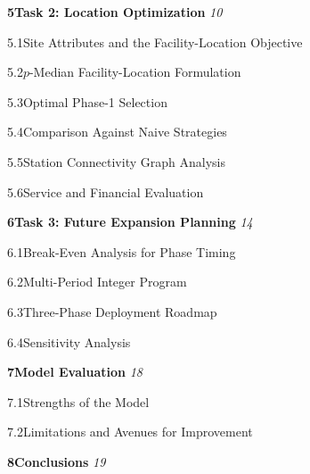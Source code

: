\documentclass[11pt]{article}
\begin{document}
\vspace{0.2em}
\noindent\textbf{5\quad Task 2: Location Optimization} \dotfill \textit{10}
\vspace{-0.4em}
\begin{list}{}{\setlength{\leftmargin}{2.5em}\setlength{\itemsep}{0pt}\setlength{\topsep}{0pt}\setlength{\parsep}{0pt}}
\item 5.1\quad Site Attributes and the Facility-Location Objective 
\item 5.2\quad $p$-Median Facility-Location Formulation 
\item 5.3\quad Optimal Phase-1 Selection 
\item 5.4\quad Comparison Against Naive Strategies 
\item 5.5\quad Station Connectivity Graph Analysis 
\item 5.6\quad Service and Financial Evaluation 
\end{list}

\vspace{0.2em}
\noindent\textbf{6\quad Task 3: Future Expansion Planning} \dotfill \textit{14}
\vspace{-0.4em}
\begin{list}{}{\setlength{\leftmargin}{2.5em}\setlength{\itemsep}{0pt}\setlength{\topsep}{0pt}\setlength{\parsep}{0pt}}
\item 6.1\quad Break-Even Analysis for Phase Timing 
\item 6.2\quad Multi-Period Integer Program 
\item 6.3\quad Three-Phase Deployment Roadmap 
\item 6.4\quad Sensitivity Analysis 
\end{list}

\vspace{0.2em}
\noindent\textbf{7\quad Model Evaluation} \dotfill \textit{18}
\vspace{-0.4em}
\begin{list}{}{\setlength{\leftmargin}{2.5em}\setlength{\itemsep}{0pt}\setlength{\topsep}{0pt}\setlength{\parsep}{0pt}}
\item 7.1\quad Strengths of the Model 
\item 7.2\quad Limitations and Avenues for Improvement 
\end{list}

\vspace{0.2em}
\noindent\textbf{8\quad Conclusions} \dotfill \textit{19}
\end{document}
